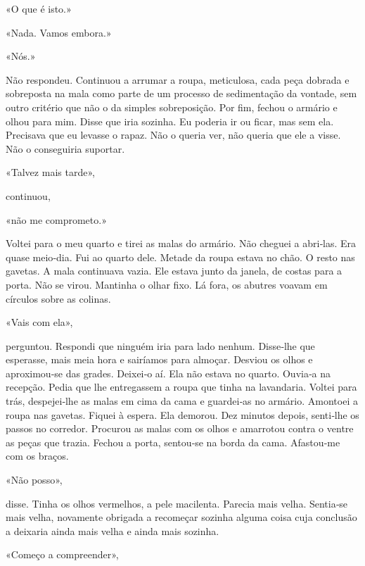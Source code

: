 «O que é isto.»

«Nada. Vamos embora.»

«Nós.»

Não respondeu. Continuou a arrumar a roupa, meticulosa, cada peça
dobrada e sobreposta na mala como parte de um processo de sedimentação
da vontade, sem outro critério que não o da simples sobreposição. Por
fim, fechou o armário e olhou para mim. Disse que iria sozinha. Eu
poderia ir ou ficar, mas sem ela. Precisava que eu levasse o rapaz. Não
o queria ver, não queria que ele a visse. Não o conseguiria suportar.

«Talvez mais tarde»,

continuou,

«não me comprometo.»

Voltei para o meu quarto e tirei as malas do armário. Não cheguei a
abri­‑las. Era quase meio­‑dia. Fui ao quarto dele. Metade da roupa
estava no chão. O resto nas gavetas. A mala continuava vazia. Ele estava
junto da janela, de costas para a porta. Não se virou. Mantinha o olhar
fixo. Lá fora, os abutres voavam em círculos sobre as colinas.

«Vais com ela»,

perguntou. Respondi que ninguém iria para lado nenhum. Disse­‑lhe que
esperasse, mais meia hora e sairíamos para almoçar. Desviou os olhos e
aproximou­‑se das grades. Deixei­‑o aí. Ela não estava no quarto.
Ouvia­‑a na recepção. Pedia que lhe entregassem a roupa que tinha na
lavandaria. Voltei para trás, despejei­‑lhe as malas em cima da cama e
guardei­‑as no armário. Amontoei a roupa nas gavetas. Fiquei à espera.
Ela demorou. Dez minutos depois, senti­‑lhe os passos no corredor.
Procurou as malas com os olhos e amarrotou contra o ventre as peças que
trazia. Fechou a porta, sentou­‑se na borda da cama. Afastou­‑me com os
braços.

«Não posso»,

disse. Tinha os olhos vermelhos, a pele macilenta. Parecia mais velha.
Sentia­‑se mais velha, novamente obrigada a recomeçar sozinha alguma
coisa cuja conclusão a deixaria ainda mais velha e ainda mais sozinha.

«Começo a compreender»,

